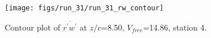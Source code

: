 \begin{figure}[H]
\centering
\texttt{[image: figs/run\_31/run\_31\_rw\_contour]}
\caption{Contour plot of $\overline{r^\prime w^\prime}$ at $z/c$=8.50, $V_{free}$=14.86, station 4.}
\label{fig:run_31_rw_contour}
\end{figure}


